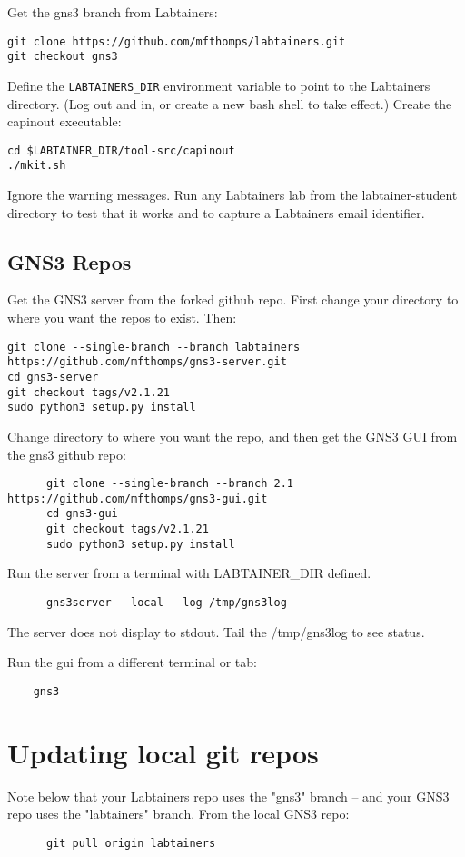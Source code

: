 \documentclass[12pt]{article}
\begin{document}
Get the gns3 branch from Labtainers:
\begin{verbatim}
git clone https://github.com/mfthomps/labtainers.git
git checkout gns3 
\end{verbatim}
\noindent Define the {\tt LABTAINERS\_DIR} environment variable to point to the Labtainers directory.
(Log out and in, or create a new bash shell to take effect.)
Create the capinout executable:
\begin{verbatim}
cd $LABTAINER_DIR/tool-src/capinout
./mkit.sh
\end{verbatim}
\noindent Ignore the warning messages.
Run any Labtainers lab from the labtainer-student directory to test that it works and to capture a
Labtainers email identifier.

\subsection{GNS3 Repos}
Get the GNS3 server from the forked github repo.  First change your directory to where you want the repos to
exist.  Then:
\small
\begin{verbatim}
git clone --single-branch --branch labtainers https://github.com/mfthomps/gns3-server.git
cd gns3-server
git checkout tags/v2.1.21
sudo python3 setup.py install
\end{verbatim}

Change directory to where you want the repo, and then get the GNS3 GUI from the gns3 github repo:
\small
\begin{verbatim}
      git clone --single-branch --branch 2.1 https://github.com/mfthomps/gns3-gui.git
      cd gns3-gui
      git checkout tags/v2.1.21
      sudo python3 setup.py install
\end{verbatim}
\normalsize
\noindent Run the server from a terminal with LABTAINER\_DIR defined.

\begin{verbatim}
      gns3server --local --log /tmp/gns3log
\end{verbatim}
\noindent The server does not display to stdout.  Tail the /tmp/gns3log to see status.

\noindent Run the gui from a different terminal or tab:
\begin{verbatim}
    gns3
\end{verbatim}

\section{Updating local git repos}
Note below that your Labtainers repo uses the "gns3" branch -- and your GNS3 repo uses the "labtainers" branch.
From the local GNS3  repo:
\begin{verbatim}
      git pull origin labtainers
\end{verbatim}
\end{document}
